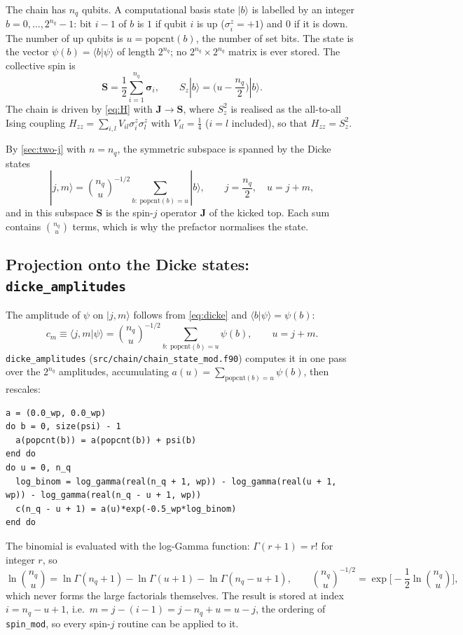 \documentclass[11pt,a4paper]{article}
\newcommand{\vJ}{\bm{J}}
\newcommand{\vS}{\bm{S}}
\begin{document}
The chain has $n_q$ qubits. A computational basis state $|b\rangle$ is labelled by an integer $b = 0,\dots,2^{n_q}-1$:
bit $i-1$ of $b$ is $1$ if qubit $i$ is up ($\sigma^z_i = +1$) and $0$ if it is down. The number of up qubits is
$u = \mathrm{popcnt}(b)$, the number of set bits. The state is the vector $\psi(b) = \langle b|\psi\rangle$ of length
$2^{n_q}$; no $2^{n_q}\times2^{n_q}$ matrix is ever stored. The collective spin is
\begin{equation}\label{eq:S}
  \vS = \frac12\sum_{i=1}^{n_q}\bm\sigma_i ,\qquad S_z|b\rangle = \Big(u - \frac{n_q}{2}\Big)|b\rangle .
\end{equation}
The chain is driven by \eqref{eq:H} with $\vJ\to\vS$, where $S_z^2$ is realised as the all-to-all Ising coupling
$H_{zz} = \sum_{i,l}V_{il}\sigma^z_i\sigma^z_l$ with $V_{il} = \frac14$ ($i = l$ included), so that $H_{zz} = S_z^2$.

By \cref{sec:two-j} with $n = n_q$, the symmetric subspace is spanned by the Dicke states
\begin{equation}\label{eq:dicke}
  |j,m\rangle = \binom{n_q}{u}^{-1/2}\sum_{b:\ \mathrm{popcnt}(b)=u}|b\rangle ,\qquad j = \frac{n_q}{2},\quad u = j+m ,
\end{equation}
and in this subspace $\vS$ is the spin-$j$ operator $\vJ$ of the kicked top. Each sum contains $\binom{n_q}{u}$ terms,
which is why the prefactor normalises the state.

\subsection{Projection onto the Dicke states: \texttt{dicke\_amplitudes}}

The amplitude of $\psi$ on $|j,m\rangle$ follows from \eqref{eq:dicke} and $\langle b|\psi\rangle = \psi(b)$:
\begin{equation}\label{eq:dicke-proj}
  \boxed{c_m \equiv \langle j,m|\psi\rangle = \binom{n_q}{u}^{-1/2}\sum_{b:\ \mathrm{popcnt}(b)=u}\psi(b),\qquad u = j+m .}
\end{equation}
\texttt{dicke\_amplitudes} (\texttt{src/chain/chain\_state\_mod.f90}) computes it in one pass over the $2^{n_q}$
amplitudes, accumulating $a(u) = \sum_{\mathrm{popcnt}(b)=u}\psi(b)$, then rescales:
\begin{lstlisting}
a = (0.0_wp, 0.0_wp)
do b = 0, size(psi) - 1
  a(popcnt(b)) = a(popcnt(b)) + psi(b)
end do
do u = 0, n_q
  log_binom = log_gamma(real(n_q + 1, wp)) - log_gamma(real(u + 1, wp)) - log_gamma(real(n_q - u + 1, wp))
  c(n_q - u + 1) = a(u)*exp(-0.5_wp*log_binom)
end do
\end{lstlisting}
The binomial is evaluated with the log-Gamma function: $\Gamma(r+1) = r!$ for integer $r$, so
\begin{equation}\label{eq:loggamma}
  \ln\binom{n_q}{u} = \ln\Gamma(n_q+1) - \ln\Gamma(u+1) - \ln\Gamma(n_q-u+1),\qquad
  \binom{n_q}{u}^{-1/2} = \exp\Big[-\frac12\ln\binom{n_q}{u}\Big],
\end{equation}
which never forms the large factorials themselves. The result is stored at index $i = n_q-u+1$, i.e.\ $m = j-(i-1) =
j - n_q + u = u-j$, the ordering of \texttt{spin\_mod}, so every spin-$j$ routine can be applied to it.
\end{document}
